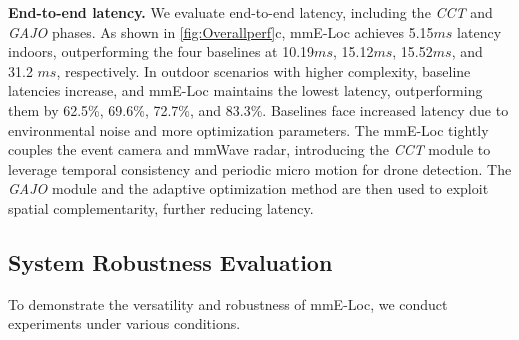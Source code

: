 \vspace{-0.3cm}
\textbf{End-to-end latency.}
We evaluate end-to-end latency, including the \textit{CCT} and \textit{GAJO} phases.
As shown in \fig \ref{fig:Overallperf}c, mmE-Loc achieves 5.15$ms$ latency indoors, outperforming the four baselines at 10.19$ms$, 15.12$ms$, 15.52$ms$, and 31.2 $ms$, respectively. 
In outdoor scenarios with higher complexity, baseline latencies increase, and mmE-Loc maintains the lowest latency, outperforming them by 62.5\%, 69.6\%, 72.7\%, and 83.3\%. 
Baselines face increased latency due to environmental noise and more optimization parameters.
The mmE-Loc tightly couples the event camera and mmWave radar, introducing the \textit{CCT} module to leverage temporal consistency and periodic micro motion for drone detection.
The \textit{GAJO} module and the adaptive optimization method are then used to exploit spatial complementarity, further reducing latency.


\vspace{-0.6cm}
\subsection{System Robustness Evaluation} \label{5.3}
To demonstrate the versatility and robustness of mmE-Loc, we conduct experiments under various conditions.

